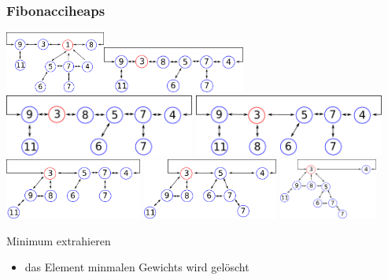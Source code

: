 \documentclass[aspectratio=1610, 11pt]{beamer}
\newcommand{\mytitle}{Fibonacciheaps}
\begin{document}
\begin{frame}\frametitle{\mytitle}
	\begin{overprint}
		 \includegraphics[height=20mm]{images/fibo3.pdf}\hfill \includegraphics[height=15mm]{images/fibo4.pdf}
		\onslide<3> \hfill \includegraphics[height=20mm]{images/fibo4.pdf}
		\onslide<4> \hfill \includegraphics[height=20mm]{images/fibo5.pdf}
		\onslide<5> \hfill \includegraphics[height=20mm]{images/fibo6.pdf}
		\onslide<6> \hfill \includegraphics[height=20mm]{images/fibo7.pdf}
		\onslide<7> \hfill \includegraphics[height=20mm]{images/fibo8.pdf}
	\end{overprint}
	\begin{overprint}
		\onslide<1>
\begin{exampleblock}{Minimum extrahieren}
		\begin{itemize}
			\item das Element minmalen Gewichts wird gel\"oscht

\end{itemize}
\end{exampleblock}
\end{overprint}
\end{frame}
\end{document}
